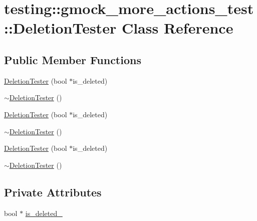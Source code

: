 \hypertarget{classtesting_1_1gmock__more__actions__test_1_1_deletion_tester}{}\section{testing\+::gmock\+\_\+more\+\_\+actions\+\_\+test\+::Deletion\+Tester Class Reference}
\label{classtesting_1_1gmock__more__actions__test_1_1_deletion_tester}
\subsection*{Public Member Functions}
\begin{DoxyCompactItemize}
\item 
\mbox{\hyperlink{classtesting_1_1gmock__more__actions__test_1_1_deletion_tester_a3b9670fc6d29cb9d120fb0fdd2ba68d8}{Deletion\+Tester}} (bool $\ast$is\+\_\+deleted)
\item 
\mbox{\hyperlink{classtesting_1_1gmock__more__actions__test_1_1_deletion_tester_ac79602dcb18df1747b086d7118e7e5f7}{$\sim$\+Deletion\+Tester}} ()
\item 
\mbox{\hyperlink{classtesting_1_1gmock__more__actions__test_1_1_deletion_tester_a3b9670fc6d29cb9d120fb0fdd2ba68d8}{Deletion\+Tester}} (bool $\ast$is\+\_\+deleted)
\item 
\mbox{\hyperlink{classtesting_1_1gmock__more__actions__test_1_1_deletion_tester_ac79602dcb18df1747b086d7118e7e5f7}{$\sim$\+Deletion\+Tester}} ()
\item 
\mbox{\hyperlink{classtesting_1_1gmock__more__actions__test_1_1_deletion_tester_a3b9670fc6d29cb9d120fb0fdd2ba68d8}{Deletion\+Tester}} (bool $\ast$is\+\_\+deleted)
\item 
\mbox{\hyperlink{classtesting_1_1gmock__more__actions__test_1_1_deletion_tester_ac79602dcb18df1747b086d7118e7e5f7}{$\sim$\+Deletion\+Tester}} ()
\end{DoxyCompactItemize}
\subsection*{Private Attributes}
\begin{DoxyCompactItemize}
\item 
bool $\ast$ \mbox{\hyperlink{classtesting_1_1gmock__more__actions__test_1_1_deletion_tester_a93d7366d91fc8b1deacbf4cff88825c0}{is\+\_\+deleted\+\_\+}}
\end{DoxyCompactItemize}


